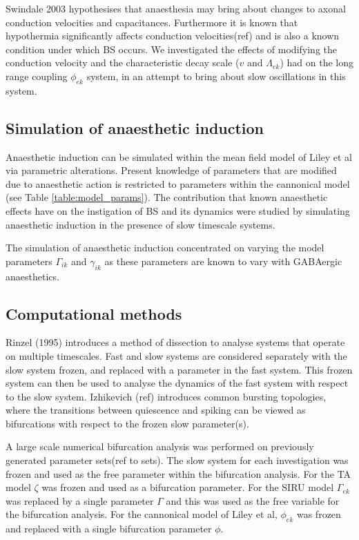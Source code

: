 \documentclass[a4paper,12pt]{article}
\begin{document}
Swindale 2003 hypothesises that anaesthesia may bring about changes to axonal conduction velocities and capacitances. Furthermore it is known that hypothermia significantly affects conduction velocities(ref) and is also a known condition under which BS occurs. We investigated the
effects of modifying the conduction velocity and the characteristic decay scale ($v$ and $\Lambda_{ek}$) had on the
long range coupling $\phi_{ek}$ system, in an attempt to bring about slow oscillations in this system.

\subsection{Simulation of anaesthetic induction}
Anaesthetic induction can be simulated within the mean field model of Liley et al via parametric alterations. Present knowledge of parameters that are modified due to anaesthetic action is restricted to parameters within the cannonical model (see Table \ref{table:model_params}). The contribution that known anaesthetic effects have on the instigation of BS and its dynamics were studied by simulating anaesthetic induction in the presence of slow timescale systems. 

The simulation of anaesthetic induction concentrated on varying the model parameters $\Gamma_{ik}$ and $\gamma_{ik}$ as these parameters are known to vary with GABAergic anaesthetics. 

\subsection{Computational methods}
Rinzel (1995) introduces a method of dissection to analyse systems that operate on multiple timescales. Fast and slow systems are considered separately with the slow system frozen, and replaced with a parameter in the fast system. This frozen system can then be used to analyse the dynamics of the fast system with respect to the slow system. Izhikevich (ref) introduces common bursting topologies, where the transitions between quiescence and spiking can be viewed as bifurcations with respect to the frozen slow parameter(s).

A large scale numerical bifurcation analysis was performed on previously generated parameter sets(ref to sets). The slow system for each investigation was frozen and used as the free parameter within the bifurcation analysis. For the TA model $\zeta$ was frozen and used as a bifurcation parameter. For the SIRU model $\Gamma_{ek}$ was replaced by a single parameter $\Gamma$ and this was used as the free variable for the bifurcation analysis. For the cannonical model of Liley et al, $\phi_{ek}$ was frozen and replaced with a single bifurcation parameter $\phi$.
\end{document}
